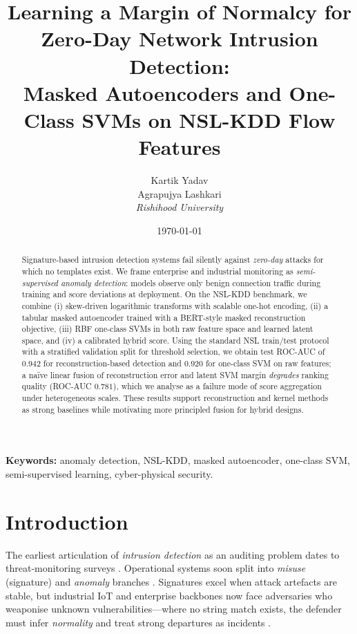 \documentclass[11pt,a4paper]{article}
\title{\textbf{Learning a Margin of Normalcy for Zero-Day Network Intrusion Detection:\\
Masked Autoencoders and One-Class SVMs on NSL-KDD Flow Features}}
\author{%
  Kartik Yadav\\
  Agrapujya Lashkari\\[0.75em]
  \textit{Rishihood University}%
}
\date{\today}
\begin{document}
\maketitle

\begin{abstract}
Signature-based intrusion detection systems fail silently against \emph{zero-day} attacks for which no templates exist. We frame enterprise and industrial monitoring as \emph{semi-supervised anomaly detection}: models observe only benign connection traffic during training and score deviations at deployment. On the NSL-KDD benchmark, we combine (i) skew-driven logarithmic transforms with scalable one-hot encoding, (ii) a tabular masked autoencoder trained with a BERT-style masked reconstruction objective, (iii) RBF one-class SVMs in both raw feature space and learned latent space, and (iv) a calibrated hybrid score. Using the standard NSL train/test protocol with a stratified validation split for threshold selection, we obtain test ROC-AUC of $0.942$ for reconstruction-based detection and $0.920$ for one-class SVM on raw features; a na\"ive linear fusion of reconstruction error and latent SVM margin \emph{degrades} ranking quality (ROC-AUC $0.781$), which we analyse as a failure mode of score aggregation under heterogeneous scales. These results support reconstruction and kernel methods as strong baselines while motivating more principled fusion for hybrid designs.
\end{abstract}

\noindent\textbf{Keywords:} anomaly detection, NSL-KDD, masked autoencoder, one-class SVM, semi-supervised learning, cyber-physical security.

\section{Introduction}
\label{sec:intro}

The earliest articulation of \emph{intrusion detection} as an auditing problem dates to threat-monitoring surveys \citep{anderson1980threats}. Operational systems soon split into \emph{misuse} (signature) and \emph{anomaly} branches \citep{lippmann2000progress}. Signatures excel when attack artefacts are stable, but industrial IoT and enterprise backbones now face adversaries who weaponise unknown vulnerabilities---where no string match exists, the defender must infer \emph{normality} and treat strong departures as incidents \citep{chandola2009anomaly}.
\end{document}

